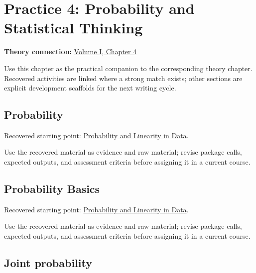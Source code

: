 \documentclass[
  letterpaper,
]{scrbook}
\begin{document}
\chapter*{Practice 4: Probability and Statistical
Thinking}\label{ch-practice-04}


\textbf{Theory connection:} \hyperref[ch-probability]{Volume I, Chapter
4}

Use this chapter as the practical companion to the corresponding theory
chapter. Recovered activities are linked where a strong match exists;
other sections are explicit development scaffolds for the next writing
cycle.

\section*{Probability}\label{sec-pr-04-probability}


Recovered starting point:
\hyperref[sec-lab-probability-linearity]{Probability and Linearity in
Data}.

Use the recovered material as evidence and raw material; revise package
calls, expected outputs, and assessment criteria before assigning it in
a current course.

\section*{Probability Basics}\label{sec-pr-04-probability-basics}


Recovered starting point:
\hyperref[sec-lab-probability-linearity]{Probability and Linearity in
Data}.

Use the recovered material as evidence and raw material; revise package
calls, expected outputs, and assessment criteria before assigning it in
a current course.

\section*{Joint probability}\label{sec-pr-04-joint-probability}
\end{document}
